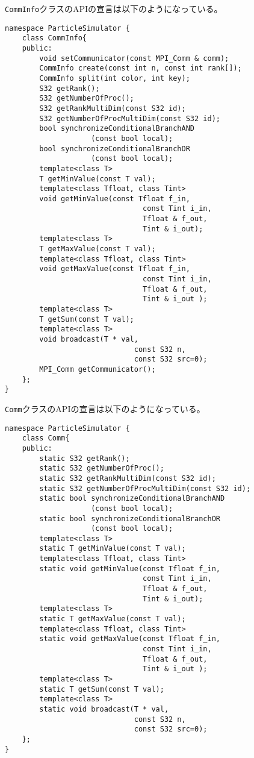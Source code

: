 {\tt CommInfo}クラスのAPIの宣言は以下のようになっている。
\begin{lstlisting}[caption=CommunicationInformation]
namespace ParticleSimulator {
    class CommInfo{
    public:
        void setCommunicator(const MPI_Comm & comm);
        CommInfo create(const int n, const int rank[]);
        CommInfo split(int color, int key);
        S32 getRank();
        S32 getNumberOfProc();
        S32 getRankMultiDim(const S32 id);
        S32 getNumberOfProcMultiDim(const S32 id);
        bool synchronizeConditionalBranchAND
                    (const bool local);
        bool synchronizeConditionalBranchOR
                    (const bool local);
        template<class T>
        T getMinValue(const T val);
        template<class Tfloat, class Tint>
        void getMinValue(const Tfloat f_in,
                                const Tint i_in,
                                Tfloat & f_out,
                                Tint & i_out);
        template<class T>
        T getMaxValue(const T val);
        template<class Tfloat, class Tint>
        void getMaxValue(const Tfloat f_in,
                                const Tint i_in,
                                Tfloat & f_out,
                                Tint & i_out );
        template<class T>
        T getSum(const T val);
        template<class T>
        void broadcast(T * val,
                              const S32 n,
                              const S32 src=0);
        MPI_Comm getCommunicator();
    };
}
\end{lstlisting}


{\tt Comm}クラスのAPIの宣言は以下のようになっている。
\begin{lstlisting}[caption=Communication]
namespace ParticleSimulator {
    class Comm{
    public:
        static S32 getRank();
        static S32 getNumberOfProc();
        static S32 getRankMultiDim(const S32 id);
        static S32 getNumberOfProcMultiDim(const S32 id);
        static bool synchronizeConditionalBranchAND
                    (const bool local);
        static bool synchronizeConditionalBranchOR
                    (const bool local);
        template<class T>
        static T getMinValue(const T val);
        template<class Tfloat, class Tint>
        static void getMinValue(const Tfloat f_in,
                                const Tint i_in,
                                Tfloat & f_out,
                                Tint & i_out);
        template<class T>
        static T getMaxValue(const T val);
        template<class Tfloat, class Tint>
        static void getMaxValue(const Tfloat f_in,
                                const Tint i_in,
                                Tfloat & f_out,
                                Tint & i_out );
        template<class T>
        static T getSum(const T val);
        template<class T>
        static void broadcast(T * val,
                              const S32 n,
                              const S32 src=0);
    };
}
\end{lstlisting}

